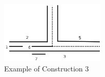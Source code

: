  \begin{figure}[htb]	
 \center%
 \includegraphics[width=5cm]{./img/noClawHorizontal.png}
 \caption{Example of Construction 3 }
\label{fig:noClawHorizontal}
\end{figure}  
 